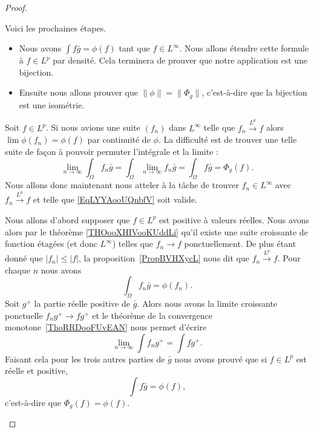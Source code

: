 \begin{proof}
\begin{subproof}

    Voici les prochaines étapes.
    \begin{itemize}
        \item Nous avons \( \int f\bar g=\phi(f)\) tant que \( f\in L^{\infty}\). Nous allons étendre cette formule à \( f\in L^p\) par densité. Cela terminera de prouver que notre application est une bijection.
        \item Ensuite nous allons prouver que \( \| \phi \|=\| \Phi_g \|\), c'est-à-dire que la bijection est une isométrie.
    \end{itemize}

    \spitem[De \( L^{\infty}\) à \( L^p\)]

    Soit \( f\in L^p\). Si nous avions une suite \( (f_n) \) dans \( L^{\infty}\) telle que \( f_n\stackrel{L^p}{\longrightarrow}f\) alors \( \lim \phi(f_n)=\phi(f)\) par continuité de \( \phi\). La difficulté est de trouver une telle suite de façon à pouvoir permuter l'intégrale et la limite :
    \begin{equation}    \label{EqLYYAooUQnbfV}
        \lim_{n\to \infty} \int_{\Omega}f_n\bar g=\int_{\Omega}\lim_{n\to \infty} f_n\bar g=\int_{\Omega}f\bar g=\Phi_g(f).
    \end{equation}
    Nous allons donc maintenant nous atteler à la tâche de trouver \( f_n\in L^{\infty}\) avec \( f_n\stackrel{L^p}{\longrightarrow}f\) et telle que \eqref{EqLYYAooUQnbfV} soit valide.

    Nous allons d'abord supposer que \( f\in L^p\) est positive à valeurs réelles. Nous avons alors par le théorème \ref{THOooXHIVooKUddLi} qu'il existe une suite croissante de fonction étagées (et donc \( L^{\infty}\)) telles que \( f_n\to f\) ponctuellement. De plus étant donné que \( | f_n |\leq | f |\), la proposition~\ref{PropBVHXycL} nous dit que \( f_n\stackrel{L^p}{\longrightarrow}f\). Pour chaque \( n\) nous avons
    \begin{equation}
        \int_{\Omega}f_n\bar g=\phi(f_n).
    \end{equation}
    Soit \( g^+\) la partie réelle positive de \( \bar g\). Alors nous avons la limite croissante ponctuelle \( f_ng^+\to fg^+\) et le théorème de la convergence monotone~\ref{ThoRRDooFUvEAN} nous permet d'écrire
    \begin{equation}
        \lim_{n\to \infty} \int f_ng^+=\int fg^+.
    \end{equation}
    Faisant cela pour les trois autres parties de \( \bar g\) nous avons prouvé que si \( f\in L^p\) est réelle et positive,
    \begin{equation}
        \int f\bar g=\phi(f),
    \end{equation}
    c'est-à-dire que \( \Phi_g(f)=\phi(f)\).


\end{subproof}
\end{proof}
